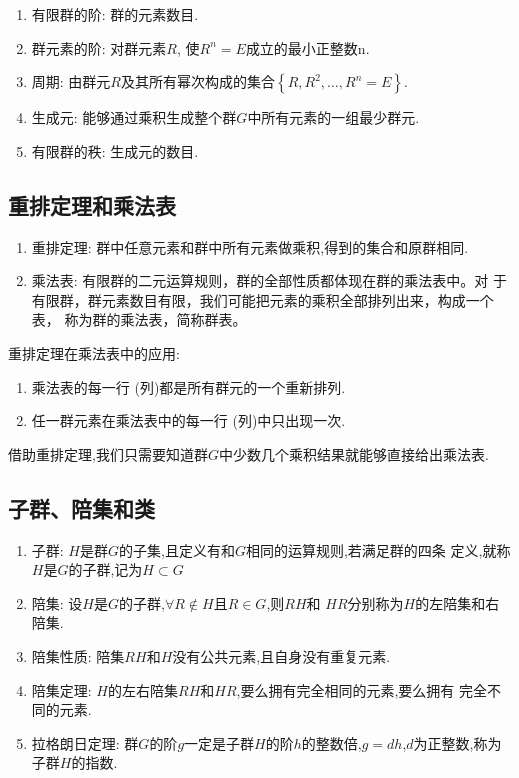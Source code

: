 \documentclass{ctexart}
\begin{document}
\begin{enumerate}
    \item 有限群的阶: 群的元素数目.
    \item 群元素的阶: 对群元素$R$, 使$R^{n}=E$成立的最小正整数n.
    \item 周期: 由群元$R$及其所有幂次构成的集合$\left\{R,R^{2},\ldots,R^{n}
=E \right\}$.
    \item 生成元: 能够通过乘积生成整个群$G$中所有元素的一组最少群元.
    \item 有限群的秩: 生成元的数目.
\end{enumerate}

\subsection{重排定理和乘法表}

\begin{enumerate}
    \item 重排定理:  群中任意元素和群中所有元素做乘积,得到的集合和原群相同.
    \item 乘法表: 有限群的二元运算规则，群的全部性质都体现在群的乘法表中。对
    于有限群，群元素数目有限，我们可能把元素的乘积全部排列出来，构成一个表，
    称为群的乘法表，简称群表。
\end{enumerate}

重排定理在乘法表中的应用:
\begin{enumerate}
    \item 乘法表的每一行 (列)都是所有群元的一个重新排列.
    \item 任一群元素在乘法表中的每一行 (列)中只出现一次.
\end{enumerate}

借助重排定理,我们只需要知道群$G$中少数几个乘积结果就能够直接给出乘法表.

\subsection{子群、陪集和类}

\begin{enumerate}
    \item 子群: $H$是群$G$的子集,且定义有和$G$相同的运算规则,若满足群的四条
    定义,就称$H$是$G$的子群,记为$H\subset G$
    \item 陪集: 设$H$是$G$的子群,$\forall R \notin H$且$R\in G$,则$RH$和
    $HR$分别称为$H$的左陪集和右陪集.
    \item 陪集性质: 陪集$RH$和$H$没有公共元素,且自身没有重复元素.
    \item 陪集定理: $H$的左右陪集$RH$和$HR$,要么拥有完全相同的元素,要么拥有
    完全不同的元素.
    \item 拉格朗日定理: 群$G$的阶$g$一定是子群$H$的阶$h$的整数倍,$g=dh$,$d
    $为正整数,称为子群$H$的指数.
\end{enumerate}
\end{document}
